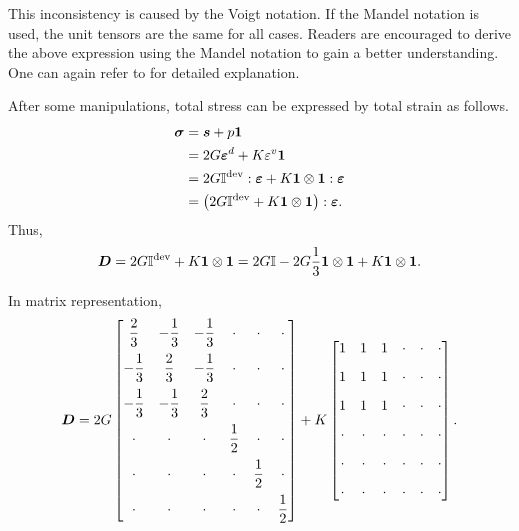 This inconsistency is caused by the Voigt notation.
If the Mandel notation is used, the unit tensors are the same for all cases.
Readers are encouraged to derive the above expression using the Mandel notation to gain a better understanding.
One can again refer to \cite{Helnwein2001} for detailed explanation.

After some manipulations, total stress can be expressed by total strain as follows.
\begin{gather}
\begin{split}
\bm{\sigma}&=\bm{s}+p\bm{1}\\
&=2G\bm{\varepsilon}^d+K\varepsilon^v\bm{1}\\
&=2G\mathbb{I}^\text{dev}:\bm{\varepsilon}+K\bm{1}\otimes\bm{1}:\bm{\varepsilon}\\
&=\left(2G\mathbb{I}^\text{dev}+K\bm{1}\otimes\bm{1}\right):\bm{\varepsilon}.
\end{split}
\end{gather}
Thus,
\begin{gather}
\bm{D}=2G\mathbb{I}^\text{dev}+K\bm{1}\otimes\bm{1}=2G\mathbb{I}-2G\dfrac{1}{3}\bm{1}\otimes\bm{1}+K\bm{1}\otimes\bm{1}.
\end{gather}

In matrix representation,
\begin{gather}
\bm{D}=2G\begin{bmatrix}
\dfrac{2}{3}&-\dfrac{1}{3}&-\dfrac{1}{3}&\cdot&\cdot&\cdot\\[3mm]
-\dfrac{1}{3}&\dfrac{2}{3}&-\dfrac{1}{3}&\cdot&\cdot&\cdot\\[3mm]
-\dfrac{1}{3}&-\dfrac{1}{3}&\dfrac{2}{3}&\cdot&\cdot&\cdot\\[3mm]
\cdot&\cdot&\cdot&\dfrac{1}{2}&\cdot&\cdot\\[3mm]
\cdot&\cdot&\cdot&\cdot&\dfrac{1}{2}&\cdot\\[3mm]
\cdot&\cdot&\cdot&\cdot&\cdot&\dfrac{1}{2}
\end{bmatrix}+K\begin{bmatrix}
1&1&1&\cdot&\cdot&\cdot\\[3mm]
1&1&1&\cdot&\cdot&\cdot\\[3mm]
1&1&1&\cdot&\cdot&\cdot\\[3mm]
\cdot&\cdot&\cdot&\cdot&\cdot&\cdot\\[3mm]
\cdot&\cdot&\cdot&\cdot&\cdot&\cdot\\[3mm]
\cdot&\cdot&\cdot&\cdot&\cdot&\cdot
\end{bmatrix}.
\end{gather}


